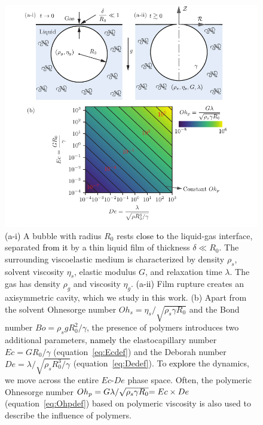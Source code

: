 \documentclass{jfm}
\newcommand{\DL}[1]{{\textcolor{black}{#1}}}
\newcommand{\AKD}[1]{{\textcolor{black}{#1}}}
\begin{document}
\begin{figure}
	\centering
	\includegraphics[width=\textwidth]{Bubblebursting_polymers_schematic_v5-eps-converted-to.pdf}
	\caption { \AKD{(a-i)} A bubble with radius $R_0$ rests \DL{close to} the liquid-gas interface, separated \DL{from it} by a thin liquid film of thickness $\delta \ll R_0$. The surrounding viscoelastic medium is characterized by density $\rho_s$, solvent viscosity $\eta_s$, elastic modulus $G$, and relaxation time $\lambda$. The gas has density $\rho_g$ and viscosity $\eta_g$. \AKD{(a-ii)} Film rupture creates an axisymmetric cavity, which we study in this work. (b) Apart from the solvent Ohnesorge number $Oh_s = \eta_s/\sqrt{\rho_s\gamma R_0}$ and the Bond number $Bo = \rho_sgR_0^2/\gamma$, the presence of polymers introduces two additional parameters, \DL{namely} the elastocapillary number $Ec = GR_0/\gamma$ (equation~\eqref{eq:Ecdef}) and the Deborah number $De = \lambda/\sqrt{\rho_s R_0^3/\gamma}$ (equation~\eqref{eq:Dedef}). To \DL{explore} the dynamics, we move across the entire $Ec$-$De$ phase space. Often, the polymeric Ohnesorge number $Oh_p = G\lambda/\sqrt{\rho_s\gamma R_0} \DL{ = Ec \times De}$ (equation~\eqref{eq:Ohpdef})  based on polymeric viscosity is also used to describe the influence of polymers.}
	\label{schematic}
\end{figure}
\end{document}
